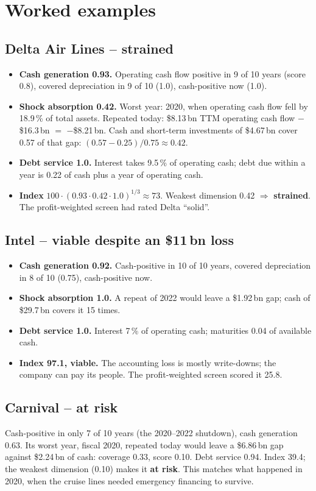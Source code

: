 \documentclass[11pt,a4paper]{article}
\begin{document}
\section{Worked examples}

\subsection{Delta Air Lines -- strained}
\begin{itemize}
  \item \textbf{Cash generation 0.93.} Operating cash flow positive in 9 of 10 years (score 0.8), covered depreciation in 9 of 10 (1.0), cash-positive now (1.0).
  \item \textbf{Shock absorption 0.42.} Worst year: 2020, when operating cash flow fell by 18.9\,\% of total assets. Repeated today: \$8.13\,bn TTM operating cash flow $-$ \$16.3\,bn $=$ $-$\$8.21\,bn. Cash and short-term investments of \$4.67\,bn cover 0.57 of that gap: $(0.57-0.25)/0.75 \approx 0.42$.
  \item \textbf{Debt service 1.0.} Interest takes 9.5\,\% of operating cash; debt due within a year is 0.22 of cash plus a year of operating cash.
  \item \textbf{Index} $100\cdot(0.93 \cdot 0.42 \cdot 1.0)^{1/3} \approx 73$. Weakest dimension 0.42 $\Rightarrow$ \textbf{strained}. The profit-weighted screen had rated Delta ``solid''.
\end{itemize}

\subsection{Intel -- viable despite an \$11\,bn loss}
\begin{itemize}
  \item \textbf{Cash generation 0.92.} Cash-positive in 10 of 10 years, covered depreciation in 8 of 10 (0.75), cash-positive now.
  \item \textbf{Shock absorption 1.0.} A repeat of 2022 would leave a \$1.92\,bn gap; cash of \$29.7\,bn covers it 15 times.
  \item \textbf{Debt service 1.0.} Interest 7\,\% of operating cash; maturities 0.04 of available cash.
  \item \textbf{Index 97.1, viable.} The accounting loss is mostly write-downs; the company can pay its people. The profit-weighted screen scored it 25.8.
\end{itemize}

\subsection{Carnival -- at risk}
Cash-positive in only 7 of 10 years (the 2020--2022 shutdown), cash generation 0.63. Its worst year, fiscal 2020, repeated today would leave a \$6.86\,bn gap against \$2.24\,bn of cash: coverage 0.33, score 0.10. Debt service 0.94. Index 39.4; the weakest dimension (0.10) makes it \textbf{at risk}. This matches what happened in 2020, when the cruise lines needed emergency financing to survive.
\end{document}
